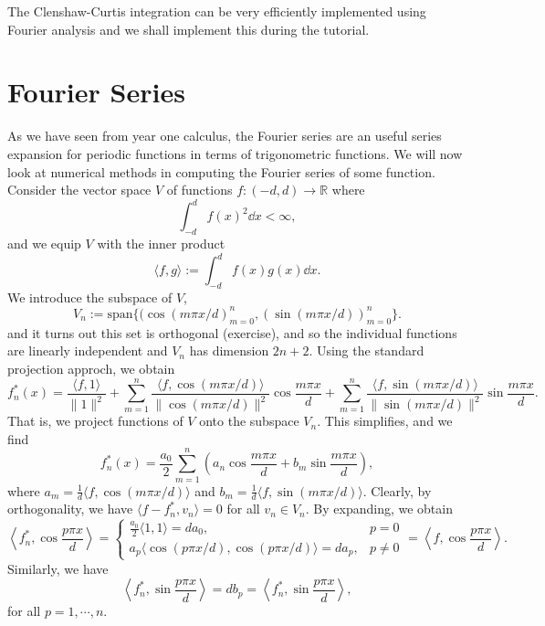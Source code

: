 \documentclass[
]{article}
\theoremstyle{definition}
\theoremstyle{definition}
\begin{document}
The Clenshaw-Curtis integration can be very efficiently implemented
using Fourier analysis and we shall implement this during the tutorial.

\newpage

\hypertarget{fourier-series}{%
\section{Fourier Series}\label{fourier-series}}

As we have seen from year one calculus, the Fourier series are an useful
series expansion for periodic functions in terms of trigonometric
functions. We will now look at numerical methods in computing the
Fourier series of some function. Consider the vector space \(V\) of
functions \(f : (-d, d) \to \mathbb{R}\) where
\[\int_{-d}^d f(x)^2 \dd x < \infty,\] and we equip \(V\) with the inner
product \[\langle f, g \rangle := \int_{-d}^d f(x)g(x) \dd x.\] We
introduce the subspace of \(V\),
\[V_n := \text{span} \{(\cos(m\pi x/ d)_{m = 0}^n, (\sin (m\pi x / d))_{m = 0}^n \}.\]
and it turns out this set is orthogonal (exercise), and so the
individual functions are linearly independent and \(V_n\) has dimension
\(2n + 2\). Using the standard projection approch, we obtain
\[f_n^* (x) = \frac{\langle f, 1 \rangle}{\|1\|^2} + \sum_{m = 1}^n 
  \frac{\langle f, \cos(m\pi x / d) \rangle}{\|\cos (m\pi x / d)\|^2} \cos \frac{m \pi x}{d} 
  +
  \sum_{m = 1}^n \frac{\langle f, \sin(m\pi x / d) \rangle}{\|\sin (m\pi x / d)\|^2} \sin \frac{m \pi x}{d}.
\] That is, we project functions of \(V\) onto the subspace \(V_n\).
This simplifies, and we find
\[f_n^*(x) = \frac{a_0}{2} \sum_{m = 1}^n \left(a_n \cos \frac{m\pi x}{d} + 
  b_m \sin \frac{m \pi x}{d}\right),\] where
\(a_m = \frac{1}{d} \langle f, \cos (m \pi x / d) \rangle\) and
\(b_m = \frac{1}{d} \langle f, \sin(m \pi x / d) \rangle\). Clearly, by
orthogonality, we have \(\langle f - f_n^*, v_n \rangle = 0\) for all
\(v_n \in V_n\). By expanding, we obtain \[
\left\langle f_n^*, \cos \frac{p \pi x}{d} \right\rangle = 
\begin{cases}
  \frac{a_0}{2} \langle 1, 1 \rangle = da_0, & p = 0\\
  a_p\langle \cos (p \pi x / d), \cos (p \pi x / d) \rangle = da_p, & p \neq 0
\end{cases} = \left\langle f, \cos \frac{p \pi x}{d} \right\rangle.\]
Similarly, we have \[
  \left\langle f_n^*, \sin \frac{p \pi x}{d} \right\rangle = 
  db_p = \left\langle f_n^*, \sin \frac{p \pi x}{d} \right\rangle,\] for
all \(p = 1, \cdots, n\).
\end{document}
